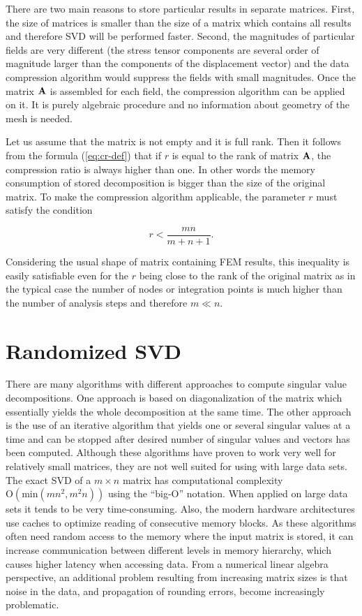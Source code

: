 There are two main reasons to store particular results in separate matrices. First, the size of matrices is smaller than the size of a matrix which contains all results and therefore SVD will be performed faster. Second, the magnitudes of particular fields are very different (the stress tensor components are several order of magnitude larger than the components of the displacement vector) and the data compression algorithm would suppress the fields with small magnitudes. Once the matrix $\mathbf{A}$ is assembled for each field, the compression algorithm can be applied on it. It is purely algebraic procedure and no information about geometry of the mesh is needed.

Let us assume that the matrix is not empty and it is full rank. Then it follows from the formula (\ref{eq:cr-def}) that if $r$ is equal to the rank of matrix $\mathbf{A}$, the compression ratio is always higher than one. In other words the memory consumption of stored decomposition is bigger than the size of the original matrix. To make the compression algorithm applicable, the parameter $r$ must satisfy the condition

\begin{equation}
r<\frac{m n}{m+n+1}.
\label{eq:r-ineq}
\end{equation}

\noindent
Considering the usual shape of matrix containing FEM results, this inequality is easily satisfiable even for the $r$ being close to the rank of the original matrix as in the typical case the number of nodes or integration points is much higher than the number of analysis steps and therefore $m \ll n$.


\section{Randomized SVD}

There are many algorithms with different approaches to compute singular value decompositions. One approach is based on diagonalization of the matrix which essentially yields the whole decomposition at the same time. The other approach is the use of an iterative algorithm that yields one or several singular values at a time and can be stopped after desired number of singular values and vectors has been computed. Although these algorithms have proven to work very well for relatively small matrices, they are not well suited for using with large data sets. The exact SVD of a $m \times n$ matrix has computational complexity $\mathrm{O}(\mathrm{min}(mn^2, m^2n))$ using the ``big-O'' notation. When applied on large data sets it tends to be very time-consuming. Also, the modern hardware architectures use caches to optimize reading of consecutive memory blocks. As these algorithms often need random access to the memory where the input matrix is stored, it can increase communication between different levels in memory hierarchy, which causes higher latency when accessing data. From a numerical linear algebra perspective, an additional problem resulting from increasing matrix sizes is that noise in the data, and propagation of rounding errors, become increasingly problematic.

